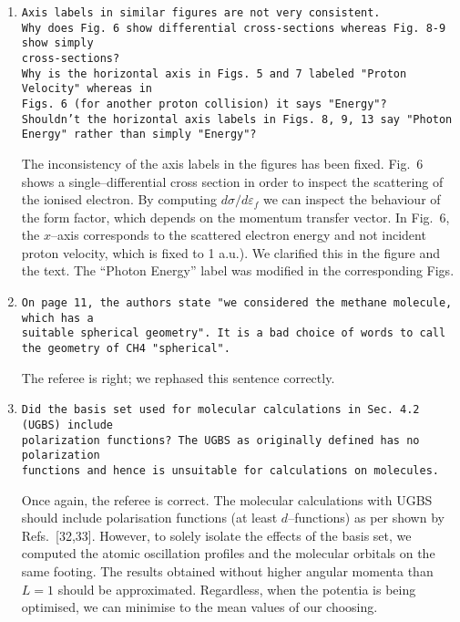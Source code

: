 \documentclass[10pt]{article}
\begin{document}
\begin{enumerate}
 \item {\tt Axis labels in similar figures are not very consistent.
 \\ Why does Fig.~6 show differential cross-sections whereas 
 Fig. 8-9 show simply \\ cross-sections? \\ Why is the horizontal
 axis in Figs.~5 and 7 labeled "Proton Velocity" whereas in \\
 Figs.~6 (for another proton collision) it says "Energy"? \\
 Shouldn't the horizontal axis labels in Figs. 8, 9, 13 say 
 "Photon Energy" rather than simply "Energy"?}
 
 The inconsistency of the axis labels in the figures has been 
 fixed. Fig.~6 shows a single--differential cross section in order 
 to inspect the scattering of the ionised electron. By computing 
 $d\sigma/d\varepsilon_{\!f}$ we can inspect the behaviour
 of the form factor, which depends on the momentum transfer 
 vector. In Fig.~6, the $x$--axis corresponds to the scattered
 electron energy and not incident proton velocity, which is fixed
 to 1 a.u.). We clarified this in the figure and the text. The
 ``Photon Energy'' label was modified in the corresponding Figs.
 
 \item {\tt On page 11, the authors state "we considered the
 methane molecule, which has a \\ suitable spherical geometry". 
 It is a bad choice of words to call the geometry of CH4
 "spherical".}
 
 The referee is right; we rephased this sentence correctly.
 
 \item {\tt Did the basis set used for molecular calculations in
 Sec. 4.2 (UGBS) include \\ polarization functions? The UGBS as 
 originally defined has no polarization \\ functions and hence is 
 unsuitable for calculations on molecules.}
 
 Once again, the referee is correct. The molecular calculations 
 with UGBS should include polarisation functions (at least 
 $d$--functions) as per shown by Refs.~[32,33]. However, to 
 solely isolate the effects of the basis set, we computed the
 atomic oscillation profiles and the molecular orbitals on the 
 same footing. The results obtained without higher angular momenta
 than $L=1$ should be approximated. Regardless, when the potentia
 is being optimised, we can minimise to the mean values of our
 choosing.
 

\end{enumerate}
\end{document}
